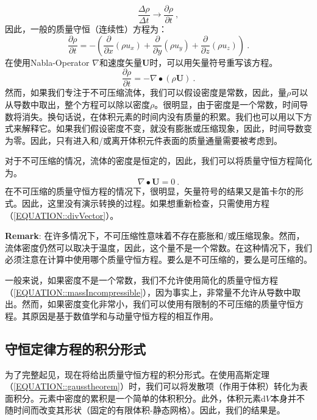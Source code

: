 \documentclass[LBMDerivation.tex]{subfiles}
\begin{document}
\begin{equation}
  \frac{\Delta \rho}{\Delta t} \to \frac{\partial \rho}{\partial t} ~,
\end{equation}
%
%
%
%
	因此，一般的质量守恒（连续性）方程为：
%
%
\begin{equation}
\boxed{
 \frac{\partial \rho}{\partial t} =
 - \left(
      \frac{\partial}{\partial x} (\rho u_x)
    + \frac{\partial}{\partial y} (\rho u_y)
    + \frac{\partial}{\partial z} (\rho u_z)
   \right)
   } ~.
\end{equation}
%
%
	在使用Nabla-Operator $\nabla$和速度矢量\textbf{U}时，可以用矢量符号重写该方程。
%
%
\begin{equation}
\boxed{
 \frac{\partial \rho}{\partial t} =
 -   \nabla \bullet \left(\rho \textbf{U}\right)
   } ~.
   \label{EQUATION::massCompressible}
\end{equation}
%
%
	然而，如果我们专注于不可压缩流体，我们可以假设密度是常数，因此，量$\rho$可以从导数中取出，整个方程可以除以密度$\rho$。很明显，由于密度是一个常数，时间导数将消失。换句话说，在体积元素的时间内没有质量的积累。我们也可以用以下方式来解释它。如果我们假设密度不变，就没有膨胀或压缩现象，因此，时间导数变为零。因此，只有进入和/或离开体积元件表面的质量通量需要被考虑到。
	
  对于不可压缩的情况，流体的密度是恒定的，因此，我们可以将质量守恒方程简化为。
%
%
\begin{equation}
 \boxed{  \nabla \bullet \textbf{U} = 0} ~.
 \label{EQUATION::massIncompressible}
\end{equation}
%
%
在不可压缩的质量守恒方程的情况下，很明显，矢量符号的结果又是笛卡尔的形式。因此，这里没有演示转换的过程。如果想重新检查，只需使用方程（\ref{EQUATION::divVector}）。

	\textbf{Remark}: 在许多情况下，不可压缩性意味着不存在膨胀和/或压缩现象。然而，流体密度仍然可以取决于温度，因此，这个量不是一个常数。在这种情况下，我们必须注意在计算中使用哪个质量守恒方程。要么是不可压缩的，要么是可压缩的。
	
  一般来说，如果密度不是一个常数，我们不允许使用简化的质量守恒方程（\ref{EQUATION::massIncompressible}），因为事实上，非常量不允许从导数中取出。然而，如果密度变化非常小，我们可以使用有限制的不可压缩的质量守恒方程。其原因是基于数值学和与动量守恒方程的相互作用。



%
%
\subsection{守恒定律方程的积分形式}
%
%
	为了完整起见，现在将给出质量守恒方程的积分形式。在使用高斯定理（\ref{EQUATION::gausstheorem}）时，我们可以将发散项（作用于体积）转化为表面积分。元素中密度的累积是一个简单的体积积分。此外，体积元素d$V$本身并不随时间而改变其形状（固定的有限体积-静态网格）。因此，我们的结果是。
%
%
\end{document}
